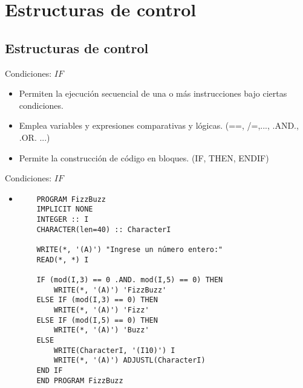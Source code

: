 
\section{Estructuras de control}  


\subsection{Estructuras de control}

\begin{frame}[fragile]{Condiciones: $IF$ } 
 \begin{itemize}[<+(0)->]
  \item Permiten la ejecución secuencial de una o más instrucciones bajo ciertas condiciones. 
  \item Emplea variables y expresiones comparativas y lógicas. (==, /=,..., .AND., .OR. ...) 
  \item Permite la construcción de código en bloques. (IF, THEN, ENDIF)
 \end{itemize}
\end{frame}


\begin{frame}[fragile]{Condiciones: $IF$ } 
 \begin{itemize}[<+(0)->]
  \item []  
  \begin{verbatim}
    PROGRAM FizzBuzz  
    IMPLICIT NONE
    INTEGER :: I
    CHARACTER(len=40) :: CharacterI

    WRITE(*, '(A)') "Ingrese un número entero:"
    READ(*, *) I

    IF (mod(I,3) == 0 .AND. mod(I,5) == 0) THEN
        WRITE(*, '(A)') 'FizzBuzz'
    ELSE IF (mod(I,3) == 0) THEN
        WRITE(*, '(A)') 'Fizz'
    ELSE IF (mod(I,5) == 0) THEN
        WRITE(*, '(A)') 'Buzz'
    ELSE
        WRITE(CharacterI, '(I10)') I
        WRITE(*, '(A)') ADJUSTL(CharacterI)
    END IF
    END PROGRAM FizzBuzz
  \end{verbatim}
 \end{itemize}
\end{frame}